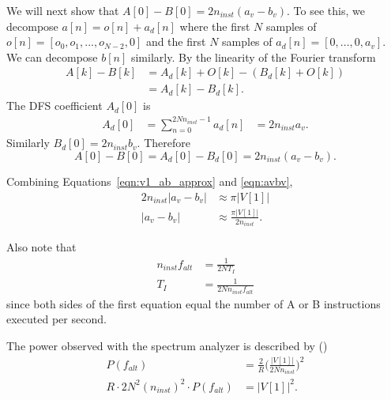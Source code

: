 \vskip 0.1in
We will next show that $A[0] - B[0] = 2 n_{inst} (a_v - b_v)$. 
To see this, we decompose $a[n] = o[n] + a_d[n]$ where the first $N$ samples of $o[n] = [o_0, o_1, ..., o_{N-2}, 0]$ and the first $N$ samples of $a_d[n] = [0, ..., 0, a_v]$. We can decompose $b[n]$ similarly.  By the linearity of the Fourier transform
\begin{equation}
   \begin{aligned}
     A[k] - B[k] & = A_d[k] + O[k] - ( B_d[k] + O[k] ) \\
      & = A_d[k] - B_d[k].
   \end{aligned}
\end{equation}
The DFS coefficient $A_d[0]$ is
\begin{equation}
  \begin{aligned}
  A_d[0] & = \sum_{n=0}^{2Nn_{inst}-1} a_d[n]
         & = 2n_{inst} a_v.
  \end{aligned}
\end{equation}
Similarly $B_d[0] = 2n_{inst} b_v$. Therefore
\begin{equation}
  \label{eqn:avbv}
  A[0] - B[0] = A_d[0] - B_d[0] =  2n_{inst} (a_v - b_v).
\end{equation}

Combining Equations~\ref{eqn:v1_ab_approx} and \ref{eqn:avbv},
\begin{equation}
  \label{eqn:avbv_V1}
  \begin{aligned}
    2n_{inst} |a_v - b_v| & \approx \pi |V[1]| \\
    |a_v - b_v| & \approx  \frac{\pi |V[1]|}{2n_{inst}}.
  \end{aligned}
\end{equation}

Also note that
\begin{equation}
  \label{eqn:inst_per_sec}
  \begin{aligned}
    n_{inst} f_{alt}  & = \frac{1}{2NT_I}\\
    T_I & = \frac{1}{2Nn_{inst} f_{alt}} 
  \end{aligned}
\end{equation}
since both sides of the first equation equal the number of A or B instructions executed per second. 

The power observed with the spectrum analyzer is described by (\cite{Heinzel2002,NumericalC})
\begin{equation}
  \label{eqn:P_f_alt}
  \begin{aligned}
    P(f_{alt}) & = \frac{2}{R} \Big(\frac{ |V[1]|}{2Nn_{inst}}\Big)^2 \\
    R \cdot 2N^2(n_{inst})^2 \cdot P(f_{alt}) & = |V[1]|^2.
  \end{aligned}
\end{equation}

